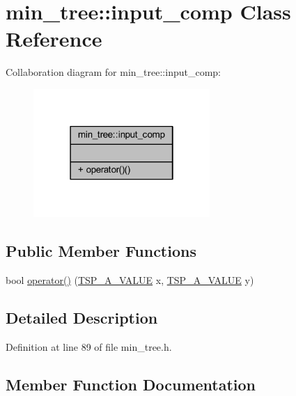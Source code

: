 \hypertarget{classmin__tree_1_1input__comp}{}\section{min\+\_\+tree\+:\+:input\+\_\+comp Class Reference}
\label{classmin__tree_1_1input__comp}


Collaboration diagram for min\+\_\+tree\+:\+:input\+\_\+comp\+:\nopagebreak
\begin{figure}[H]
\begin{center}
\leavevmode
\includegraphics[width=190pt]{classmin__tree_1_1input__comp__coll__graph}
\end{center}
\end{figure}
\subsection*{Public Member Functions}
\begin{DoxyCompactItemize}
\item 
bool \mbox{\hyperlink{classmin__tree_1_1input__comp_aa8adc0ff623a26d69c2d6307820997c9}{operator()}} (\mbox{\hyperlink{classmin__tree_af83e196caf3ebcdc9035dc42aee581ee}{T\+S\+P\+\_\+\+A\+\_\+\+V\+A\+L\+UE}} x, \mbox{\hyperlink{classmin__tree_af83e196caf3ebcdc9035dc42aee581ee}{T\+S\+P\+\_\+\+A\+\_\+\+V\+A\+L\+UE}} y)
\end{DoxyCompactItemize}


\subsection{Detailed Description}


Definition at line 89 of file min\+\_\+tree.\+h.



\subsection{Member Function Documentation}
\mbox{\label{classmin__tree_1_1input__comp_aa8adc0ff623a26d69c2d6307820997c9}} 
